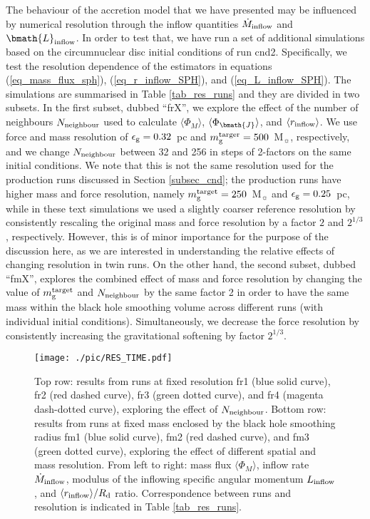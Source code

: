 \documentclass[a4paper,fleqn,usenatbib]{mnras}
\begin{document}
The behaviour of the accretion model that we have presented may be influenced by numerical resolution through the inflow quantities $\dot{M}_{\rm inflow}$ and $\bmath{L}_{\rm inflow}$.
In order to test that, we have run a set of additional simulations based on the circumnuclear disc initial conditions of run cnd2.
Specifically, we test the resolution dependence of the estimators in equations (\ref{eq_mass_flux_sph}), (\ref{eq_r_inflow_SPH}), and (\ref{eq_L_inflow_SPH}).
The simulations are summarised in Table \ref{tab_res_runs} and they are divided in two subsets.
In the first subset, dubbed ``frX'', we explore the effect of the number of neighbours $N_{\rm neighbour}$ used to calculate $\langle \Phi_{M} \rangle$, $\langle \Phi_{\bmath{J}} \rangle$, and $\langle r_{\rm inflow} \rangle$.
We use force and mass resolution of $\epsilon_{\rm g} = 0.32$~pc and $m_{\rm g}^{\rm targer} = 500$~M$_{\sun}$, respectively, and we change $N_{\rm neighbour}$ between 32 and 256 in steps of 2-factors on the same initial conditions.
We note that this is not the same resolution used for the production runs discussed in Section \ref{subsec_cnd}; the production runs have higher mass and force resolution, namely $m_{\rm g}^{\rm target} = 250$~M$_{\sun}$ and $\epsilon_{\rm g} = 0.25$~pc, while in these text simulations we used a slightly coarser reference resolution by consistently rescaling the original mass and force resolution by a factor $2$ and $2^{1/3}$, respectively.
However, this is of minor importance for the purpose of the discussion here, as we are interested in understanding the relative effects of changing resolution in twin runs.
On the other hand, the second subset, dubbed ``fmX'', explores the combined effect of mass and force resolution by changing the value of $m_{\rm g}^{\rm target}$ and $N_{\rm neighbour}$ by the same factor 2 in order to have the same mass within the black hole smoothing volume across different runs (with individual initial conditions).
Simultaneously, we decrease the force resolution by consistently increasing the gravitational softening by factor $2^{1/3}$.

\begin{figure*}
\begin{center}
\texttt{[image: ./pic/RES\_TIME.pdf]}
\caption{Top row: results from runs at fixed resolution fr1 (blue solid curve), fr2 (red dashed curve), fr3 (green dotted curve), and fr4 (magenta dash-dotted curve), exploring the effect of $N_{\rm neighbour}$.
Bottom row: results from runs at fixed mass enclosed by the black hole smoothing radius fm1 (blue solid curve), fm2 (red dashed curve), and fm3 (green dotted curve), exploring the effect of different spatial and mass resolution.
From left to right: mass flux $\langle \Phi_{M} \rangle$, inflow rate $\dot{M}_{\rm inflow}$, modulus of the inflowing specific angular momentum $L_{\rm inflow}$, and $\langle r_{\rm inflow} \rangle / R_{\rm d}$ ratio.
Correspondence between runs and resolution is indicated in Table \ref{tab_res_runs}.}
\label{fig_res_time}
\end{center}
\end{figure*}
\end{document}
